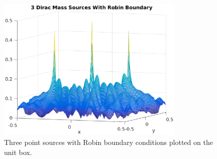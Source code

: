 \documentclass[10pt,a4paper]{article}
\begin{document}
\begin{figure}[H]
\centering
    \includegraphics[width=0.8\textwidth]{figures/ThreeSources_3D.eps}
	\caption{Three point sources with Robin boundary conditions plotted on the unit box.}
  \label{fig:severalSourcesRBC3D}
\end{figure}
\end{document}
